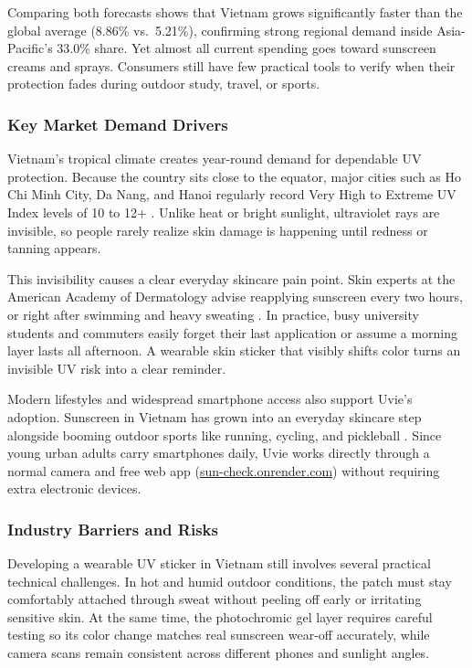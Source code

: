 Comparing both forecasts shows that Vietnam grows significantly faster than the
global average (8.86\% vs.\ 5.21\%), confirming strong regional demand inside
Asia-Pacific's 33.0\% share. Yet almost all current spending goes toward
sunscreen creams and sprays. Consumers still have few practical tools to verify
when their protection fades during outdoor study, travel, or sports.

\subsubsection{Key Market Demand Drivers}
Vietnam's tropical climate creates year-round demand for dependable UV protection.
Because the country sits close to the equator, major cities such as Ho Chi Minh
City, Da Nang, and Hanoi regularly record Very High to Extreme UV Index levels of
10 to 12+ \citep{who2022}. Unlike heat or bright sunlight, ultraviolet rays are
invisible, so people rarely realize skin damage is happening until redness or
tanning appears.

This invisibility causes a clear everyday skincare pain point. Skin experts at the
American Academy of Dermatology advise reapplying sunscreen every two hours, or
right after swimming and heavy sweating \citep{aad2023}. In practice, busy
university students and commuters easily forget their last application or assume a
morning layer lasts all afternoon. A wearable skin sticker that visibly shifts
color turns an invisible UV risk into a clear reminder.

Modern lifestyles and widespread smartphone access also support Uvie's adoption.
Sunscreen in Vietnam has grown into an everyday skincare step alongside booming
outdoor sports like running, cycling, and pickleball \citep{statista2024}. Since
young urban adults carry smartphones daily, Uvie works directly through a normal
camera and free web app (\href{https://sun-check.onrender.com}{sun-check.onrender.com})
without requiring extra electronic devices.

\subsubsection{Industry Barriers and Risks}
Developing a wearable UV sticker in Vietnam still involves several practical
technical challenges. In hot and humid outdoor conditions, the patch must stay
comfortably attached through sweat without peeling off early or irritating
sensitive skin. At the same time, the photochromic gel layer requires careful
testing so its color change matches real sunscreen wear-off accurately, while
camera scans remain consistent across different phones and sunlight angles.

